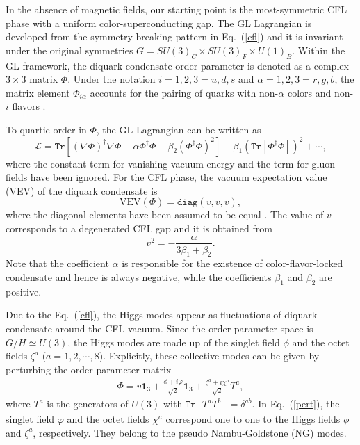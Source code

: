 \documentclass[12pt]{article}
\begin{document}
In the absence of magnetic fields, our starting point is the most-symmetric CFL phase with a uniform
color-superconducting gap. The GL Lagrangian is developed from the symmetry breaking pattern in Eq.~(\ref{cfl}) and it is invariant
under the original symmetries $G=SU(3)_C \times SU(3)_F\times U(1)_B$. Within the GL framework, the
diquark-condensate order parameter is denoted as a complex $3\times3$ matrix $\Phi$. Under the notation
$i = 1, 2, 3 = u, d, s$ and $\alpha = 1, 2, 3 = r, g, b$, the matrix element $\Phi_{i \alpha}$ accounts
for the pairing of quarks with non-$\alpha$ colors and non-$i$ flavors \cite{iida2002superfluid}.

To quartic order in $\Phi$, the GL Lagrangian can be written as~\cite{iida2002superfluid,giannakis2002ginzburg}
\begin{equation}
\mathcal{L}=
\texttt{Tr}\left[(\nabla\Phi)^\dagger\nabla\Phi
  -\alpha\Phi^\dagger\Phi -\beta_2(\Phi^\dagger\Phi)^2\right]
-\beta_1(\texttt{Tr}[\Phi^\dagger\Phi])^2 +\cdots ,\label{gl}
\end{equation}
where the constant term for vanishing vacuum energy and the term for gluon fields have been
ignored. For the CFL phase, the vacuum expectation value (VEV) of the diquark condensate is
\begin{equation}
  \text{VEV}(\Phi)=\texttt{diag}(v,v,v) ,\label{cflground}
\end{equation}
where the diagonal elements have been assumed to be equal \cite{iida2002superfluid}. The value of
$v$ corresponds to a degenerated CFL gap and it is obtained from
\begin{equation}
  \label{eq:dvaccum}
v^2 = -\frac{\alpha}{3\beta_1+\beta_2}.
\end{equation}
Note that the coefficient $\alpha$ is responsible for the existence of color-flavor-locked condensate
and hence is always negative, while the coefficients $\beta_1$ and $\beta_2$ are positive.

Due to the Eq.~(\ref{cfl}), the Higgs modes appear as fluctuations of diquark condensate around the
CFL vacuum. Since the order parameter space is $G/H \simeq U(3)$, the Higgs modes are made up of the
singlet field $\phi$ and the octet fields $\zeta^a$ ($a = 1, 2, \cdots, 8$). Explicitly, these
collective modes can be given by perturbing the order-parameter matrix
\begin{eqnarray}
\Phi=v\textbf{1}_3+\frac{\phi+i\varphi}{\sqrt{2}}\textbf{1}_3+\frac{\zeta^a+i\chi^a}{\sqrt{2}}T^a,
\label{pert}
\end{eqnarray}
where $T^a$ is the generators of $U(3)$ with $\texttt{Tr}[T^a T^b]=\delta^{ab}$.
In Eq.~(\ref{pert}), the singlet field $\varphi$ and the octet fields $\chi^a$ correspond one to
one to the Higgs fields $\phi$ and $\zeta^a$, respectively. They belong to the pseudo Nambu-Goldstone
(NG) modes.
\end{document}
